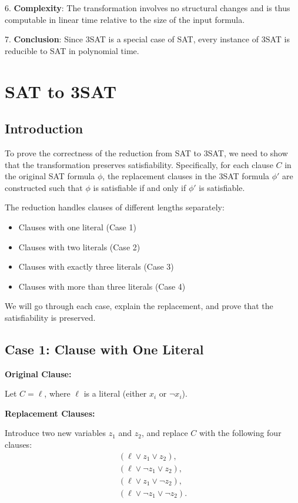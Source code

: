 \documentclass[a4paper]{article}
\begin{document}
6. \textbf{Complexity}:  
   The transformation involves no structural changes and is thus computable in linear time relative to the size of the input formula.

7. \textbf{Conclusion}:  
   Since 3SAT is a special case of SAT, every instance of 3SAT is reducible to SAT in polynomial time.
\section{SAT to 3SAT}
\subsection*{Introduction}

To prove the correctness of the reduction from SAT to 3SAT, we need to show that the transformation preserves satisfiability. Specifically, for each clause \( C \) in the original SAT formula \( \phi \), the replacement clauses in the 3SAT formula \( \phi' \) are constructed such that \( \phi \) is satisfiable if and only if \( \phi' \) is satisfiable.

The reduction handles clauses of different lengths separately:
\begin{itemize}
    \item Clauses with one literal (Case 1)
    \item Clauses with two literals (Case 2)
    \item Clauses with exactly three literals (Case 3)
    \item Clauses with more than three literals (Case 4)
\end{itemize}

We will go through each case, explain the replacement, and prove that the satisfiability is preserved.

\subsection*{Case 1: Clause with One Literal}

\textbf{Original Clause:}

Let \( C = \ell \), where \( \ell \) is a literal (either \( x_i \) or \( \neg x_i \)).

\textbf{Replacement Clauses:}

Introduce two new variables \( z_1 \) and \( z_2 \), and replace \( C \) with the following four clauses:
\begin{align*}
    (\ell \lor z_1 \lor z_2), \\
    (\ell \lor \neg z_1 \lor z_2), \\
    (\ell \lor z_1 \lor \neg z_2), \\
    (\ell \lor \neg z_1 \lor \neg z_2).
\end{align*}
\end{document}
